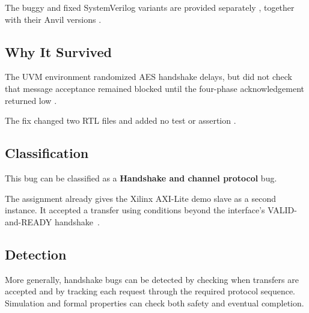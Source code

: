 \documentclass[conference]{IEEEtran}
\begin{document}
The buggy and fixed SystemVerilog variants are provided separately
\cite{bug4-sv-buggy,bug4-sv-fixed}, together with their Anvil versions
\cite{bug4-anvil-buggy,bug4-anvil-fixed}.





\subsection{Why It Survived}

The UVM environment randomized AES handshake delays, but did not check that
message acceptance remained blocked until the four-phase acknowledgement
returned low
\cite{handshake-parent,entropy-aes-agent,push-pull-agent,entropy-scoreboard}.

The fix changed two RTL files and added no test or assertion
\cite{handshake-fix-commit}.




\subsection{Classification}

This bug can be classified as a \textbf{Handshake and channel protocol} bug.

The assignment already gives the Xilinx AXI-Lite demo slave as a second
instance. It accepted a transfer using conditions beyond the interface's
VALID-and-READY handshake~\cite{xilinx-axi-demo}.




\subsection{Detection}

More generally, handshake bugs can be detected by checking when transfers are
accepted and by tracking each request through the required protocol sequence.
Simulation and formal properties can check both safety and eventual completion.
\end{document}
